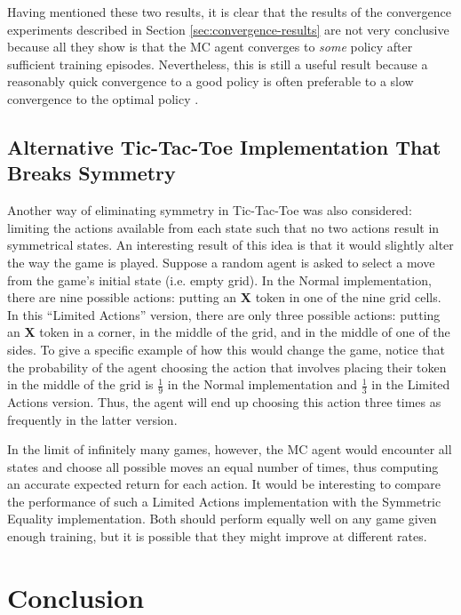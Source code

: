 \documentclass[11pt,a4paper]{report}
\begin{document}
Having mentioned these two results, it is clear that the results of the convergence experiments described in Section \ref{sec:convergence-results} are not very conclusive because all they show is that the MC agent converges to \emph{some} policy after sufficient training episodes. Nevertheless, this is still a useful result because a reasonably quick convergence to a good policy is often preferable to a slow convergence to the optimal policy \cite{rl-a-survey}.


\section{Alternative Tic-Tac-Toe Implementation That Breaks Symmetry}

Another way of eliminating symmetry in Tic-Tac-Toe was also considered: limiting the actions available from each state such that no two actions result in symmetrical states. An interesting result of this idea is that it would slightly alter the way the game is played. Suppose a random agent is asked to select a move from the game's initial state (i.e. empty grid). In the Normal implementation, there are nine possible actions: putting an \textbf{X} token in one of the nine grid cells. In this ``Limited Actions'' version, there are only three possible actions: putting an \textbf{X} token in a corner, in the middle of the grid, and in the middle of one of the sides. To give a specific example of how this would change the game, notice that the probability of the agent choosing the action that involves placing their token in the middle of the grid is $\frac{1}{9}$ in the Normal implementation and $\frac{1}{3}$ in the Limited Actions version. Thus, the agent will end up choosing this action three times as frequently in the latter version.

In the limit of infinitely many games, however, the MC agent would encounter all states and choose all possible moves an equal number of times, thus computing an accurate expected return for each action. It would be interesting to compare the performance of such a Limited Actions implementation with the Symmetric Equality implementation. Both should perform equally well on any game given enough training, but it is possible that they might improve at different rates.


\chapter{Conclusion}
\end{document}
